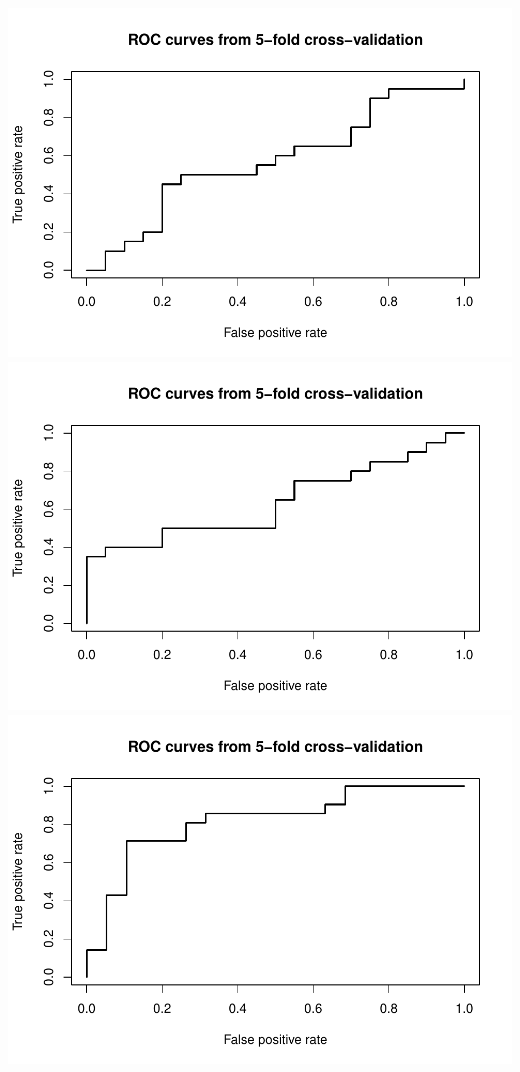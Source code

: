 \documentclass[
  11pt,
]{article}
\begin{document}
\includegraphics{final_GCM_files/figure-latex/unnamed-chunk-10-1.pdf}
\includegraphics{final_GCM_files/figure-latex/unnamed-chunk-10-2.pdf}
\includegraphics{final_GCM_files/figure-latex/unnamed-chunk-10-3.pdf}
\end{document}
